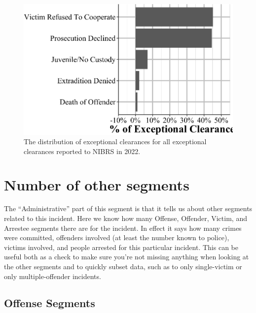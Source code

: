 \documentclass[
  12pt,
  openany]{book}
\begin{document}
\begin{figure}

{\centering \includegraphics[width=0.9\linewidth]{12_nibrs_administrative_files/figure-latex/administrativeExceptionalClearances-1} 

}

\caption{The distribution of exceptional clearances for all exceptional clearances reported to NIBRS in 2022.}\label{fig:administrativeExceptionalClearances}
\end{figure}

\section{Number of other segments}\label{number-of-other-segments}

The ``Administrative'' part of this segment is that it tells us about other segments related to this incident. Here we know how many Offense, Offender, Victim, and Arrestee segments there are for the incident. In effect it says how many crimes were committed, offenders involved (at least the number known to police), victims involved, and people arrested for this particular incident. This can be useful both as a check to make sure you're not missing anything when looking at the other segments and to quickly subset data, such as to only single-victim or only multiple-offender incidents.

\subsection{Offense Segments}\label{offense-segments}
\end{document}

